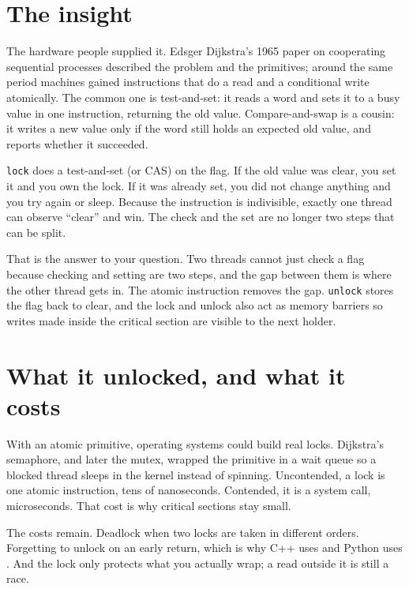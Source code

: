 \documentclass[11pt]{article}
\begin{document}
\section{The insight}
The hardware people supplied it. Edsger Dijkstra's 1965 paper on cooperating sequential processes described the problem and the primitives; around the same period machines gained instructions that do a read and a conditional write atomically. The common one is test-and-set: it reads a word and sets it to a busy value in one instruction, returning the old value. Compare-and-swap is a cousin: it writes a new value only if the word still holds an expected old value, and reports whether it succeeded.

\begin{keypoint}[title={The mechanism}]
\texttt{lock} does a test-and-set (or CAS) on the flag. If the old value was clear, you set it and you own the lock. If it was already set, you did not change anything and you try again or sleep. Because the instruction is indivisible, exactly one thread can observe ``clear'' and win. The check and the set are no longer two steps that can be split.
\end{keypoint}

That is the answer to your question. Two threads cannot just check a flag because checking and setting are two steps, and the gap between them is where the other thread gets in. The atomic instruction removes the gap. \texttt{unlock} stores the flag back to clear, and the lock and unlock also act as memory barriers so writes made inside the critical section are visible to the next holder.

\section{What it unlocked, and what it costs}
With an atomic primitive, operating systems could build real locks. Dijkstra's semaphore, and later the mutex, wrapped the primitive in a wait queue so a blocked thread sleeps in the kernel instead of spinning. Uncontended, a lock is one atomic instruction, tens of nanoseconds. Contended, it is a system call, microseconds. That cost is why critical sections stay small.

The costs remain. Deadlock when two locks are taken in different orders. Forgetting to unlock on an early return, which is why C++ uses  and Python uses . And the lock only protects what you actually wrap; a read outside it is still a race.
\end{document}
